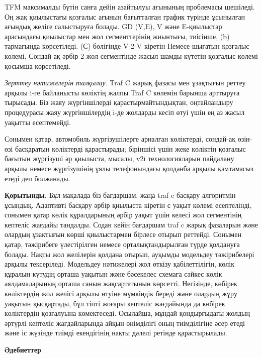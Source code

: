 \begin{multicols}{2}

TFM максималды бүтін санға дейін азайтылуы ағынының проблемасы шешіледі.
Оң жақ қиылыстағы қозғалыс ағынын бағытталған график түрінде ұсынылған
ағындық желіге салыстыруға болады. GD (V,E), V және E-қиылыстар
арасындағы қиылыстар мен жол сегменттерінің жиынтығы, тиісінше, (b)
тармағында көрсетіледі. (С) бөлігінде V-2-V кіретін Немесе шығатын
қозғалыс көлемі, Сондай-ақ әрбір 2 жол сегментінде жасыл шамды күтетін
қозғалыс көлемі қосымша көрсетіледі.

\emph{Зерттеу нәтижелерін талқылау.} Тraf C жарық фазасы мен ұзақтығын
реттеу арқылы i-ге байланысты көліктің жалпы Traf C көлемін барынша
арттыруға тырысады. Біз жаяу жүргіншілерді қарастырмайтындықтан,
оңтайландыру процедурасы жаяу жүргіншілердің i-де жолдарды кесіп өтуі
үшін ең аз жасыл уақытты есептемейді.

Сонымен қатар, автомобиль жүргізушілерге арналған көліктерді, сондай-ақ
өзін-өзі басқаратын көліктерді қарастырады; біріншісі үшін жеке көліктің
қозғалыс бағытын жүргізуші әр қиылыста, мысалы, v2i технологияларын
пайдалану арқылы немесе жүргізушінің ұялы телефонындағы қолданба арқылы
қамтамасыз етеді деп болжанады.

{\bfseries Қорытынды.} Бұл мақалада біз бағдаршам, жаңа traf c басқару
алгоритмін ұсындық. Адаптивті басқару әрбір қиылыста кіретін с уақыт
көлемі есептелінді, сонымен қатар көлік құралдарының әрбір уақыт үшін
келесі жол сегментінің кептеліс жағдайы тандалды. Содан кейін бағдаршам
traf c жарық фазаларын және олардың ұзақтығын көрші қиылыстармен бірлесе
отырып реттейді. Сонымен қатар, тәжірибеге үлестірілген немесе
орталықтандырылған түрде қолдануға болады. Нақты жол желілерін қолдана
отырып, ауқымды модельдеу тәжірибелері арқылы тексеріледі. Модельдеу
нәтижелері жол өткізу қабілеттілігін, көлік құралын күтудің орташа
уақытын және бәсекелес схемаға сәйкес көлік аялдамаларының орташа санын
жақсартатынын көрсетті. Негізінде, көбірек көліктердің жол желісі арқылы
өтуіне мүмкіндік береді және олардың жүру уақытын қысқартады, бұл тіпті
жоғары кептеліс жағдайында да көбірек көліктердің қозғалуына
көмектеседі. Осылайша, мұндай қондырғыдағы жолдың әртүрлі кептеліс
жағдайларында айқын өнімділігі оның тиімділігіне әсер етеді және іс
жүзінде тиімді екендігінің нақты дәлелі ретінде қарастырылады.
\end{multicols}

\begin{center}
  {\bfseries Әдебиеттер}
  \end{center}


